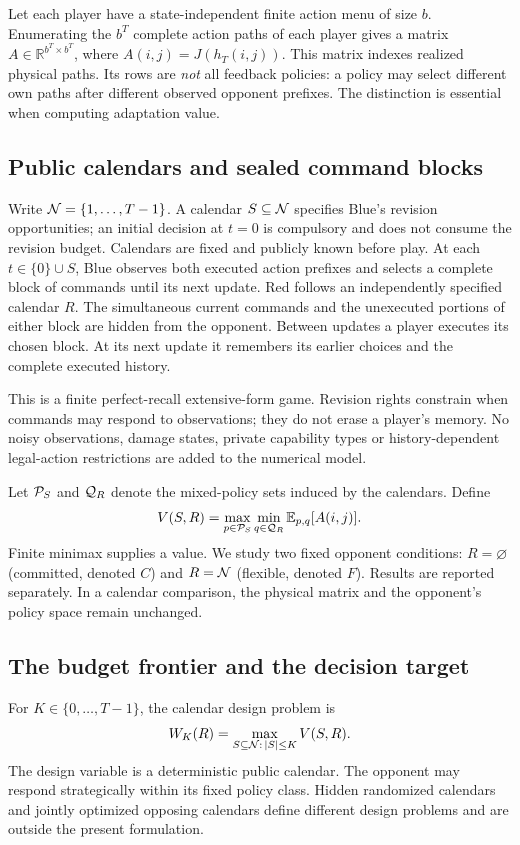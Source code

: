 Let each player have a state-independent finite action menu of size $b$.
Enumerating the $b^T$ complete action paths of each player gives a matrix
$A\in\mathbb R^{b^T\times b^T}$, where $A(i,j)=J(h_T(i,j))$.
This matrix indexes realized physical paths. Its rows are \emph{not} all
feedback policies: a policy may select different own paths after different
observed opponent prefixes. The distinction is essential when computing
adaptation value.

\subsection{Public calendars and sealed command blocks}
Write $\mathcal N=\{1,\ldots,T-1\}$. A calendar $S\subseteq\mathcal N$ specifies Blue's
revision opportunities; an initial decision at $t=0$ is compulsory and does
not consume the revision budget. Calendars are fixed and publicly known
before play. At each $t\in\{0\}\cup S$, Blue observes both executed action
prefixes and selects a complete block of commands until its next update.
Red follows an independently specified calendar $R$. The simultaneous current
commands and the unexecuted portions of either block are hidden from the
opponent. Between updates a player executes its chosen block. At its next
update it remembers its earlier choices and the complete executed history.

This is a finite perfect-recall extensive-form game. Revision rights constrain
when commands may respond to observations; they do not erase a player's
memory. No noisy observations, damage states, private capability types or
history-dependent legal-action restrictions are added to the numerical model.

Let $\mathcal P_S$ and $\mathcal Q_R$ denote the mixed-policy sets induced by the calendars.
Define
\begin{equation}
 V(S,R)=\max_{p\in\mathcal P_S}\min_{q\in\mathcal Q_R}\mathbb E_{p,q}[A(i,j)].
 \label{eq:value}
\end{equation}
Finite minimax supplies a value. We study two fixed opponent conditions:
$R=\varnothing$ (committed, denoted $C$) and $R=\mathcal N$ (flexible, denoted $F$).
Results are reported separately. In a calendar comparison, the physical
matrix and the opponent's policy space remain unchanged.

\subsection{The budget frontier and the decision target}
For $K\in\{0,\ldots,T-1\}$, the calendar design problem is
\begin{equation}
 W_K(R)=\max_{S\subseteq\mathcal N:\,|S|\le K}V(S,R).
 \label{eq:budget}
\end{equation}
The design variable is a deterministic public calendar. The opponent may
respond strategically within its fixed policy class. Hidden randomized
calendars and jointly optimized opposing calendars define different design
problems and are outside the present formulation.

